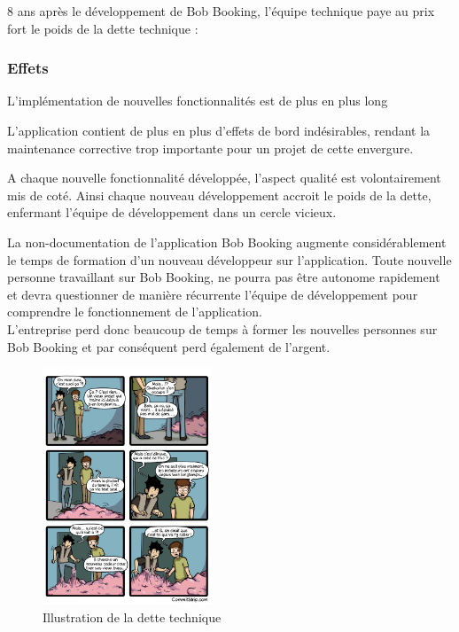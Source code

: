 8 ans après le développement de Bob Booking, l'équipe technique paye au prix fort le poids de la dette technique : 

\subsubsection{Effets}

\begin{description}
    \item L'implémentation de nouvelles fonctionnalités est de plus en plus long 
    \item L'application contient de plus en plus d'effets de bord indésirables, rendant la maintenance corrective trop importante pour un projet de cette envergure. 
    \item A chaque nouvelle fonctionnalité développée, l'aspect qualité est volontairement mis de coté. Ainsi chaque nouveau développement accroit le poids de la dette, enfermant l'équipe de développement dans un cercle vicieux. 
    \item La non-documentation de l'application Bob Booking augmente considérablement le temps de formation d'un nouveau développeur sur l'application. 
    Toute nouvelle personne travaillant sur Bob Booking, ne pourra pas être autonome rapidement et devra questionner de manière récurrente l'équipe de développement pour comprendre le fonctionnement de l'application. \\
    L'entreprise perd donc beaucoup de temps à former les nouvelles personnes sur Bob Booking et par conséquent perd également de l'argent. 
\end{description}

\begin{figure}[h!]
\centering
\includegraphics[width=0.45\textwidth]{assets/blob.jpg}
\caption{Illustration de la dette technique}
\label{fig:my_label}
\end{figure}

